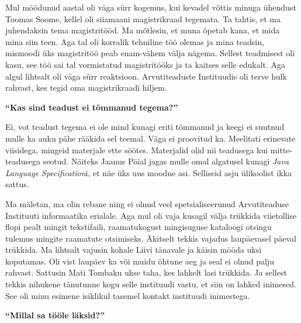 Mul möödunud aastal  oli väga sürr kogemus, kui kevadel võttis minuga ühendust Toomas Soome, kellel oli siiamaani magistrikraad tegemata. Ta tahtis, et ma juhendaksin tema magistritööd. Ma mõtlesin, et muna õpetab kana, et mida mina siin teen. Aga tal oli korralik tehniline töö olemas ja mina teadsin, mismoodi üks magistritöö peab enam-vähem välja nägema. Sellest teadmisest oli kasu, see töö sai tal vormistatud magistritööks ja ta kaitses selle edukalt. Aga algul lihtsalt oli väga sürr reaktsioon. Arvutiteaduste Instituudis oli terve hulk rahvast, kes tegid oma magistrikraadi hiljem.

\textbf{\enquote{Kas sind teadust ei tõmmanud tegema?}} 

Ei, vot teadust tegema ei ole mind kunagi eriti tõmmanud ja keegi ei suutnud mulle ka auku pähe rääkida sel teemal. Väga ei proovitud ka. Meelitati erinevate viisidega, mingeid materjale ette söötes. Materjalid olid nii teadusega kui mitte-teadusega seotud. Näiteks Jaanus Pöial jagas mulle omal algatusel kunagi \emph{Java Language Specification}i, et näe üks uus moodne asi. Selliseid asju ülikoolist ikka sattus. 

Ma mäletan, ma olin rebane ning ei olnud veel spetsialiseerunud Arvutiteaduse Instituuti informaatika erialale. Aga mul oli vaja kusagil välja trükkida viietollise flopi pealt mingit tekstifaili, raamatukogust mingisuguse kataloogi otsingu tulemus mingite raamatute otsimiseks. Äkitselt tekkis vajadus laupäevasel päeval trükkida. Ma lihtsalt vajusin kohale Liivi tänavale ja käisin mööda uksi koputamas. Oli vist laupäev ka või muidu õhtune aeg ja seal ei olnud palju rahvast. Sattusin Mati Tombaku ukse taha, kes lahkelt lasi trükkida. Ja sellest tekkis nihukene tänutunne kogu selle instituudi vastu, et siin on lahked inimesed. See oli minu esimene isiklikul tasemel kontakt instituudi inimestega.

\textbf{\enquote{Millal sa tööle läksid?}} 	

